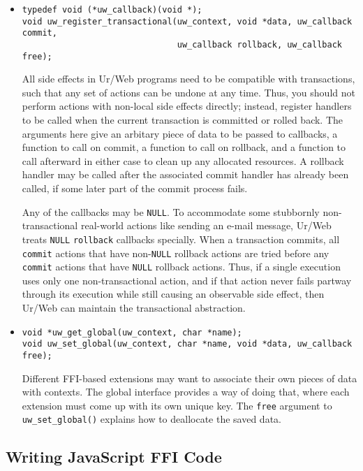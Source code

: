 \documentclass{article}
\begin{document}
\begin{itemize}
  \item \begin{verbatim}
typedef void (*uw_callback)(void *);
void uw_register_transactional(uw_context, void *data, uw_callback commit,
                               uw_callback rollback, uw_callback free);
  \end{verbatim}
  All side effects in Ur/Web programs need to be compatible with transactions, such that any set of actions can be undone at any time.  Thus, you should not perform actions with non-local side effects directly; instead, register handlers to be called when the current transaction is committed or rolled back.  The arguments here give an arbitary piece of data to be passed to callbacks, a function to call on commit, a function to call on rollback, and a function to call afterward in either case to clean up any allocated resources.  A rollback handler may be called after the associated commit handler has already been called, if some later part of the commit process fails.

  Any of the callbacks may be \texttt{NULL}.  To accommodate some stubbornly non-transactional real-world actions like sending an e-mail message, Ur/Web treats \texttt{NULL} \texttt{rollback} callbacks specially.  When a transaction commits, all \texttt{commit} actions that have non-\texttt{NULL} rollback actions are tried before any \texttt{commit} actions that have \texttt{NULL} rollback actions.  Thus, if a single execution uses only one non-transactional action, and if that action never fails partway through its execution while still causing an observable side effect, then Ur/Web can maintain the transactional abstraction.

  \item \begin{verbatim}
void *uw_get_global(uw_context, char *name);
void uw_set_global(uw_context, char *name, void *data, uw_callback free);
  \end{verbatim}
  Different FFI-based extensions may want to associate their own pieces of data with contexts.  The global interface provides a way of doing that, where each extension must come up with its own unique key.  The \texttt{free} argument to \texttt{uw\_set\_global()} explains how to deallocate the saved data.

\end{itemize}

\subsection{Writing JavaScript FFI Code}
\end{document}
